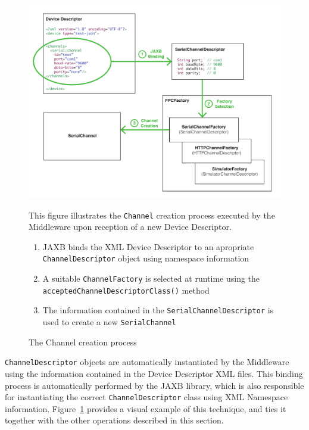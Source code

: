 \begin{figure}[!hbt]
\includegraphics[width=\textwidth]{imgs/channel_creation_process.pdf}
\caption{The Channel creation process}
\label{fig:channel.creation}
{
\begin{figurenote}
This figure illustrates the \texttt{Channel} creation process executed by the Middleware upon reception of a new Device Descriptor.
\begin{enumerate}
  \itemsep0em
  \item JAXB binds the XML Device Descriptor to an apropriate \texttt{ChannelDescriptor} object using namespace information
  \item A suitable \texttt{ChannelFactory} is selected at runtime using the \texttt{acceptedChannelDescriptorClass()} method
  \item The information contained in the \texttt{SerialChannelDescriptor} is used to create a new \texttt{SerialChannel}
\end{enumerate}
\end{figurenote}
}
\end{figure}

\texttt{ChannelDescriptor} objects are automatically instantiated by the Middleware using the information contained in the Device Descriptor XML files. This binding process is automatically performed by the JAXB library, which is also responsible for instantiating the correct \texttt{ChannelDescriptor} class using XML Namespace information. Figure~\ref{fig:channel.creation} provides a visual example of this technique, and ties it together with the other operations described in this section.

